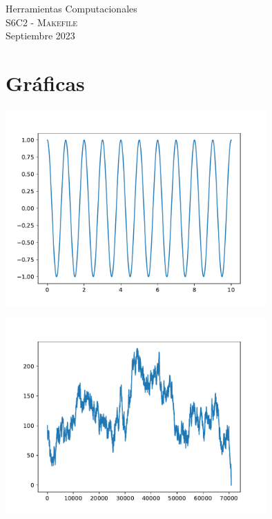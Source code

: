 \documentclass[11pt,letterpaper]{article}
\begin{document}
\begin{center}
{\Large Herramientas Computacionales} \\
S6C2 - \textsc{Makefile}\\
Septiembre 2023\\
\end{center}


\noindent
\section{Gr\'aficas}
\begin{center}
\includegraphics[width=10cm]{plot.pdf} 
\begin{center}
\end{center}
\includegraphics[width=10cm]{plot1.pdf} 
\end{center}
\end{document}
